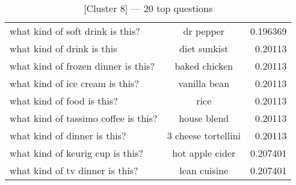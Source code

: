 \begin{table}[!th]
{\begin{tabular}{lcr}
			what kind of soft drink is this?     & dr pepper                  & 0.196369          \\
			what kind of drink is this           & diet sunkist               & 0.20113           \\
			what kind of frozen dinner is this?  & baked chicken              & 0.20113           \\
			what kind of ice cream is this?      & vanilla bean               & 0.20113           \\
			what kind of food is this?           & rice                       & 0.20113           \\
			what kind of tassimo coffee is this? & house blend                & 0.20113           \\
			what kind of dinner is this?         & 3 cheese tortellini        & 0.20113           \\
			what kind of keurig cup is this?     & hot apple cider            & 0.207401          \\
			what kind of tv dinner is this?      & lean cuisine               & 0.207401          \\
			\bottomrule
		\end{tabular}}
	\caption{[Cluster 8] --- 20 top questions}
	\vspace{-5mm}
\end{table}

